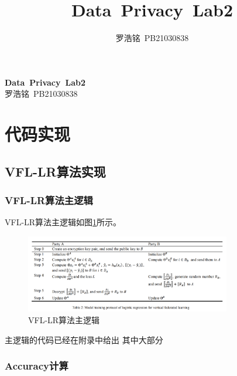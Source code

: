 \documentclass[twoside,11pt]{article}
\title{Data\ Privacy\ Lab2}
\author{罗浩铭\ PB21030838}
\begin{document}
\fancyhf{} %
\fancyfoot[C]{\thepage} %

\renewcommand{\headrulewidth}{0pt} %

\begin{center}
    \textbf{\LARGE{Data\ Privacy\ Lab2}}\\
    \vspace{0.1cm}
    \large{罗浩铭\ PB21030838}
\end{center}



\section{代码实现}
\subsection{VFL-LR算法实现}

\subsubsection{VFL-LR算法主逻辑}

VFL-LR算法主逻辑如图\ref{fig:VFL-LR}所示。

\begin{figure}[htbp]
    \centering
    \includegraphics[width=0.8\textwidth]{pic/VFL-LR.png}
    \caption{VFL-LR算法主逻辑}
    \label{fig:VFL-LR}
\end{figure}

主逻辑的代码已经在附录中给出
其中大部分

\subsubsection{Accuracy计算}
\end{document}
